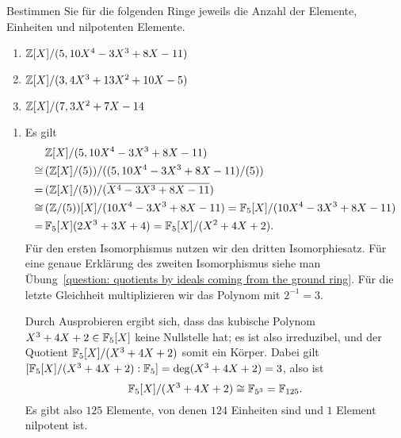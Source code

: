 \begin{question}
  Bestimmen Sie für die folgenden Ringe jeweils die Anzahl der Elemente, Einheiten und nilpotenten Elemente.
  \begin{enumerate}
    \item
      $\mathbb{Z}[X]/(5, 10 X^4 - 3 X^3 + 8 X - 11)$
    \item
      $\mathbb{Z}[X]/(3, 4 X^3 + 13 X^2 + 10 X - 5)$
    \item
      $\mathbb{Z}[X]/(7, 3 X^2 + 7X - 14$
  \end{enumerate}
\end{question}


\begin{solution}
  \begin{enumerate}
    \item
      Es gilt
      \begin{align*}
             &\,  \mathbb{Z}[X]/(5, 10 X^4 - 3 X^3 + 8 X - 11)
        \\
        \cong&\,  ( \mathbb{Z}[X]/(5) ) / ( (5, 10 X^4 - 3 X^3 + 8 X - 11)/(5) )
        \\
            =&\,  ( \mathbb{Z}[X]/(5) ) / ( \overline{X^4 - 3 X^3 + 8 X - 11} )
        \\
        \cong&\,  (\mathbb{Z}/(5))[X] / (10 X^4 - 3 X^3 + 8 X - 11)
            =     \mathbb{F}_5[X]/(10 X^4 - 3 X^3 + 8 X - 11)
        \\
            =&\,  \mathbb{F}_5[X](2 X^3 + 3 X + 4)
            =     \mathbb{F}_5[X]/(X^2 + 4 X + 2).
      \end{align*}
      Für den ersten Isomorphismus nutzen wir den dritten Isomorphiesatz.
      Für eine genaue Erklärung des zweiten Isomorphismus siehe man Übung~\ref{question: quotients by ideals coming from the ground ring}.
      Für die letzte Gleichheit multiplizieren wir das Polynom mit $2^{-1} = 3$.
      
      Durch Ausprobieren ergibt sich, dass das kubische Polynom $X^3 + 4 X + 2 \in \mathbb{F}_5[X]$ keine Nullstelle hat; es ist also irreduzibel, und der Quotient $\mathbb{F}_5[X]/(X^3 + 4 X + 2)$ somit ein Körper.
      Dabei gilt $[\mathbb{F}_5[X]/(X^3 + 4 X + 2) : \mathbb{F}_5] = \deg (X^3 + 4 X + 2) = 3$, also ist
      \[
              \mathbb{F}_5[X]/(X^3 + 4 X + 2)
        \cong \mathbb{F}_{5^3}
        =     \mathbb{F}_{125}.
      \]
      Es gibt also $125$ Elemente, von denen $124$ Einheiten sind und $1$ Element nilpotent ist.
      

\end{enumerate}
\end{solution}

